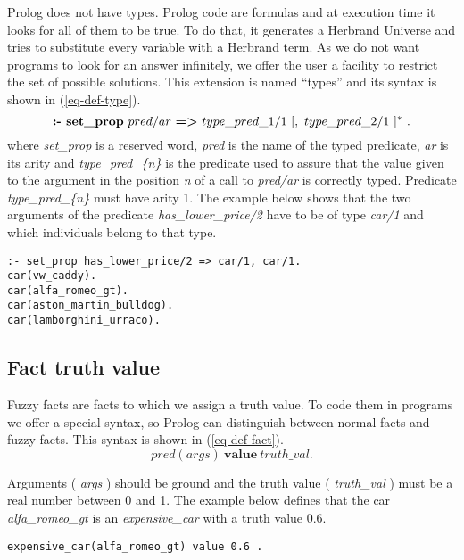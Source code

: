 \documentclass[runningheads,a4paper]{llncs}
\begin{document}
Prolog does not have types. 
Prolog code are formulas and at execution time it looks for all of them to 
be true. 
To do that, it generates a Herbrand Universe and tries to 
substitute every variable with a Herbrand term. 
As we do not want programs to look for an answer infinitely, 
we offer the user a facility to restrict the set of possible solutions.
This extension is named ``types'' and its syntax is shown 
in (\ref{eq-def-type}).
\begin{equation}
\textbf{:- set\_prop}\ pred/ar\ \textbf{=\textgreater}\ type\_pred\_1/1\ [,\ type\_pred\_2/1\ ]^*\ .
\label{eq-def-type}
\end{equation}
where {\it set\_prop} is a reserved word, {\it pred} is the name
of the typed predicate, {\it ar} is its arity and
{\it type\_pred\_\{n\}} is the predicate used to assure that the
value given to the argument in the position {\it n} of a call to
{\it pred/ar} is correctly typed. 
Predicate {\it type\_pred\_\{n\}} must have arity 1.  
The example below shows that the two arguments of the predicate
{\it has\_lower\_price/2} have to be of type {\it car/1} and
which individuals belong to that type.

\begin{verbatim}
:- set_prop has_lower_price/2 => car/1, car/1.
car(vw_caddy).
car(alfa_romeo_gt).
car(aston_martin_bulldog).
car(lamborghini_urraco).
\end{verbatim}


\subsection{Fact truth value}
\label{fact-truth-value}

Fuzzy facts are facts to which we assign a truth value. 
To code them in programs we offer a special syntax, so Prolog 
can distinguish between normal facts and fuzzy facts.
This syntax is shown in (\ref{eq-def-fact}).
\begin{equation}
pred(args)\ \textbf{value}\ truth\_val.
\label{eq-def-fact}
\end{equation}
 
Arguments ( {\it args} ) should be ground and the truth value ( {\it
truth\_val} ) must be a real number between 0 and 1.  The example 
below defines that the car {\it
alfa\_romeo\_gt} is an {\it expensive\_car} with a truth value 0.6.

\begin{verbatim}
expensive_car(alfa_romeo_gt) value 0.6 .
\end{verbatim}
\end{document}
